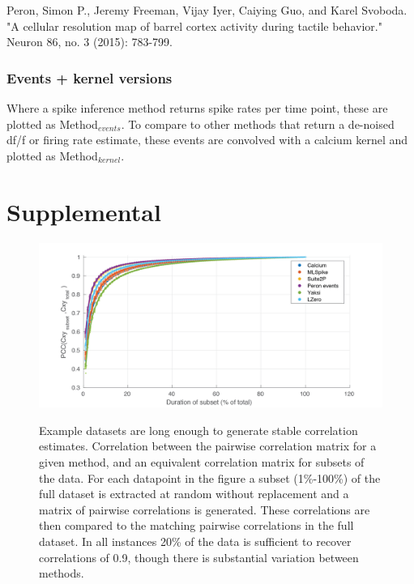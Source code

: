 \documentclass[a4paper,10pt,twocolumn]{article}
\newcommand{\beginsupplement}{%
        \setcounter{table}{0}
        \renewcommand{\thetable}{S\arabic{table}}%
        \setcounter{figure}{0}
        \renewcommand{\thefigure}{S\arabic{figure}}%
     }
\begin{document}
\noindent Peron, Simon P., Jeremy Freeman, Vijay Iyer, Caiying Guo, and Karel Svoboda. "A cellular resolution map of barrel cortex activity during tactile behavior." Neuron 86, no. 3 (2015): 783-799.

\subsubsection*{Events + kernel versions}
Where a spike inference method returns spike rates per time point, these are plotted as Method$_{events}$. To compare to other methods that return a de-noised df/f or firing rate estimate, these events are convolved with a calcium kernel and plotted as Method$_{kernel}$.

\clearpage
\beginsupplement
\section{Supplemental}

\begin{figure}[h!]
{\includegraphics[trim={30 20 60 20},clip,width=\textwidth]{figs/cxy_subset_comparison3.png}}
{\caption{\label{fig:supp_cxy_stability}Example datasets are long enough to generate stable correlation estimates. Correlation between the pairwise correlation matrix for a given method, and an equivalent correlation matrix for subsets of the data. For each datapoint in the figure a subset (1\%-100\%) of the full dataset is extracted at random without replacement and a matrix of pairwise correlations is generated. These correlations are then compared to the matching pairwise correlations in the full dataset. In all instances 20\% of the data is sufficient to recover correlations of 0.9, though there is substantial variation between methods.}}%
\end{figure} %
\end{document}
